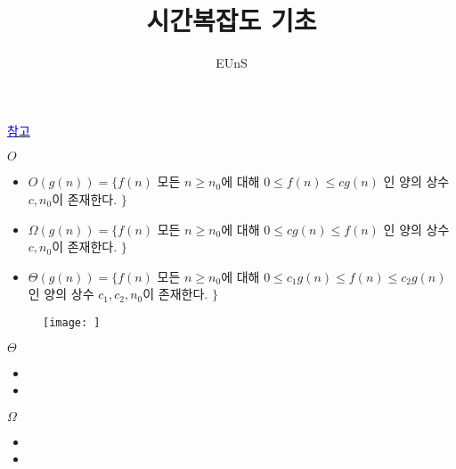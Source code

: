 \documentclass[10pt]{beamer}
\title{시간복잡도 기초}
\author{EUnS}
\begin{document}
\begin{frame}{}
    \maketitle
\end{frame}    


\begin{frame}{}
    \href{}{\textcolor{blue}{참고}}
\end{frame}    


\begin{frame}{$O$}
    \begin{itemize}
        \item $O(g(n)) = \{ f(n)$ 모든 $n \ge n_0$에 대해 $0 \le f(n) \le cg(n)$ 인 양의 상수 $c, n_0$이 존재한다. $\}$
        \pause
        \item $\Omega(g(n)) = \{ f(n)$ 모든 $n \ge n_0$에 대해 $0 \le  cg(n) \le f(n)$ 인 양의 상수 $c, n_0$이 존재한다. $\}$
        \pause
        \item $\Theta(g(n)) = \{ f(n)$ 모든 $n \ge n_0$에 대해 $0 \le  c_1 g(n) \le f(n) \le c_2g(n)$ 인 양의 상수 $c_1, c_2, n_0$이 존재한다. $\}$
    \end{itemize}
\end{frame}


\begin{frame}{}
    \begin{figure}[h!]
        \texttt{[image: ]}
        \caption{}
    \end{figure}
\end{frame}    




\begin{frame}{$\Theta$}
    \begin{itemize}
        \item 
        \item 
    \end{itemize}
\end{frame}


\begin{frame}{$\Omega$}
    \begin{itemize}
        \item 
        \item 
    \end{itemize}
\end{frame}
\end{document}
